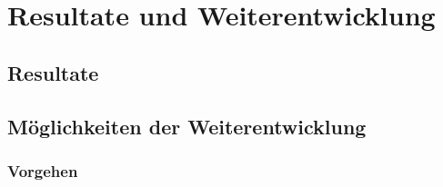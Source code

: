 \chapter{Resultate und Weiterentwicklung}
\label{pd-resultate}

\section{Resultate}


\section{Möglichkeiten der Weiterentwicklung}


\subsection{Vorgehen}